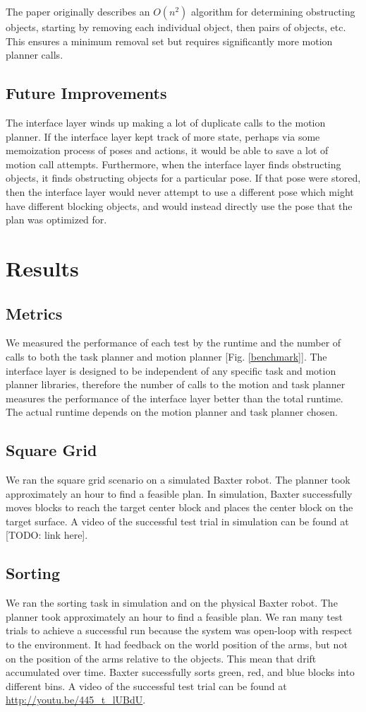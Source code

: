 \documentclass[12pt]{article}
\begin{document}
The paper originally describes an $O(n^2)$ algorithm for determining obstructing objects, starting by removing each individual object, then pairs of objects, etc.  
This ensures a minimum removal set but requires significantly more motion planner calls.

\subsection{Future Improvements}

The interface layer winds up making a lot of duplicate calls to the motion planner.
If the interface layer kept track of more state, perhaps via some memoization process of poses and actions, it would be able to save a lot of motion call attempts.
Furthermore, when the interface layer finds obstructing objects, it finds obstructing objects for a particular pose.  
If that pose were stored, then the interface layer would never attempt to use a different pose which might have different blocking objects, and would instead directly use the pose that the plan was optimized for.


\section{Results}
\subsection{Metrics}
We measured the performance of each test by the runtime and the number of calls to both the task planner and motion planner [Fig. \ref{benchmark}]. 
The interface layer is designed to be independent of any specific task and motion planner libraries, therefore the number of calls to the motion and task planner measures the performance of the interface layer better than the total runtime. 
The actual runtime depends on the motion planner and task planner chosen.

\subsection{Square Grid}
We ran the square grid scenario on a simulated Baxter robot.
The planner took approximately an hour to find a feasible plan. 
In simulation, Baxter successfully moves blocks to reach the target center block and places the center block on the target surface.
A video of the successful test trial in simulation can be found at [TODO: link here].

\subsection{Sorting}
We ran the sorting task in simulation and on the physical Baxter robot.
The planner took approximately an hour to find a feasible plan. 
We ran many test trials to achieve a successful run because the system was open-loop with respect to the environment.
It had feedback on the world position of the arms, but not on the position of the arms relative to the objects. This mean that drift accumulated over time.
Baxter successfully sorts green, red, and blue blocks into different bins. 
A video of the successful test trial can be found at \url{http://youtu.be/445_t_lUBdU}.
\end{document}
